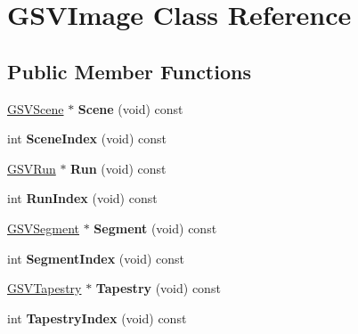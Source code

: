 \hypertarget{class_g_s_v_image}{}\section{G\+S\+V\+Image Class Reference}
\label{class_g_s_v_image}
\subsection*{Public Member Functions}
\begin{DoxyCompactItemize}
\item 
\hyperlink{class_g_s_v_scene}{G\+S\+V\+Scene} $\ast$ {\bfseries Scene} (void) const \hypertarget{class_g_s_v_image_ad06e499d63906d6501d07ad0cc0c6e7f}{}\label{class_g_s_v_image_ad06e499d63906d6501d07ad0cc0c6e7f}

\item 
int {\bfseries Scene\+Index} (void) const \hypertarget{class_g_s_v_image_a2a00248caac5c090c295fb529a0bc36e}{}\label{class_g_s_v_image_a2a00248caac5c090c295fb529a0bc36e}

\item 
\hyperlink{class_g_s_v_run}{G\+S\+V\+Run} $\ast$ {\bfseries Run} (void) const \hypertarget{class_g_s_v_image_a43060f83c923a16af2427c2b1c9e5137}{}\label{class_g_s_v_image_a43060f83c923a16af2427c2b1c9e5137}

\item 
int {\bfseries Run\+Index} (void) const \hypertarget{class_g_s_v_image_abbd94746c51ad1b499dfb62fde220f58}{}\label{class_g_s_v_image_abbd94746c51ad1b499dfb62fde220f58}

\item 
\hyperlink{class_g_s_v_segment}{G\+S\+V\+Segment} $\ast$ {\bfseries Segment} (void) const \hypertarget{class_g_s_v_image_a30590fc77f093237fa27f9d5e0279f3a}{}\label{class_g_s_v_image_a30590fc77f093237fa27f9d5e0279f3a}

\item 
int {\bfseries Segment\+Index} (void) const \hypertarget{class_g_s_v_image_a6e32bff748f2e96dd394fe7dbd884e1e}{}\label{class_g_s_v_image_a6e32bff748f2e96dd394fe7dbd884e1e}

\item 
\hyperlink{class_g_s_v_tapestry}{G\+S\+V\+Tapestry} $\ast$ {\bfseries Tapestry} (void) const \hypertarget{class_g_s_v_image_aa5c52c2c426a18866d758c7f8b53da07}{}\label{class_g_s_v_image_aa5c52c2c426a18866d758c7f8b53da07}

\item 
int {\bfseries Tapestry\+Index} (void) const \hypertarget{class_g_s_v_image_aead969de6382ce989747d400d6c483b7}{}\label{class_g_s_v_image_aead969de6382ce989747d400d6c483b7}


\end{DoxyCompactItemize}
